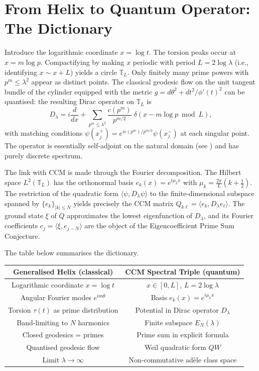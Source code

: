 \documentclass[12pt,a4paper]{article}
\newcommand{\T}{\mathbb{T}}
\begin{document}
\section{From Helix to Quantum Operator: The Dictionary}
Introduce the logarithmic coordinate $x = \log t$.  The torsion peaks occur at $x = m\log p$.  Compactifying by making $x$ periodic with period $L=2\log\lambda$ (i.e., identifying $x\sim x+L$) yields a circle $\T_L$.  Only finitely many prime powers with $p^m\le\lambda^2$ appear as distinct points.  The classical geodesic flow on the unit tangent bundle of the cylinder equipped with the metric $g = d\theta^2 + dt^2/\phi'(t)^2$ can be quantised: the resulting Dirac operator on $\T_L$ is
\[
D_\lambda = i\frac{d}{dx} + \sum_{p^m\le\lambda^2} \frac{c(p^m)}{p^{m/2}}\;\delta(x - m\log p \bmod L),
\tag{3}
\]
with matching conditions $\psi(x_j^+) = e^{i c(p^m)/p^{m/2}} \psi(x_j^-)$ at each singular point.  The operator is essentially self‑adjoint on the natural domain (see \cite{Albeverio1988}) and has purely discrete spectrum.

The link with CCM is made through the Fourier decomposition.  The Hilbert space $L^2(\T_L)$ has the orthonormal basis $e_k(x)=e^{i\mu_k x}$ with $\mu_k = \frac{2\pi}{L}(k+\frac12)$.  The restriction of the quadratic form $\langle \psi, D_\lambda\psi\rangle$ to the finite‑dimensional subspace spanned by $\{e_k\}_{|k|\le N}$ yields precisely the CCM matrix $Q_{k\ell} = \langle e_k, D_\lambda e_\ell\rangle$.  The ground state $\xi$ of $Q$ approximates the lowest eigenfunction of $D_\lambda$, and its Fourier coefficients $c_j = \langle \xi, e_{j-N}\rangle$ are the object of the Eigencoefficient Prime Sum Conjecture.

The table below summarises the dictionary.

\begin{center}
\begin{tabular}{c|c}
\textbf{Generalised Helix (classical)} & \textbf{CCM Spectral Triple (quantum)} \\
\hline
Logarithmic coordinate $x=\log t$ & $x\in[0,L]$, $L=2\log\lambda$ \\
Angular Fourier modes $e^{im\theta}$ & Basis $e_k(x)=e^{i\mu_k x}$ \\
Torsion $\tau(t)$ as prime distribution & Potential in Dirac operator $D_\lambda$ \\
Band‑limiting to $N$ harmonics & Finite subspace $E_N(\lambda)$ \\
Closed geodesics = primes & Prime sum in explicit formula \\
Quantised geodesic flow & Weil quadratic form $QW$ \\
Limit $\lambda\to\infty$ & Non‑commutative adèle class space
\end{tabular}
\end{center}
\end{document}
